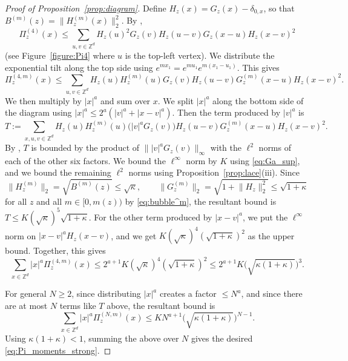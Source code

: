 \documentclass[11pt,hidelinks]{article}
\theoremstyle{plain}
\numberwithin{equation}{section}
\newcommand{\Z}{\mathbb{Z}}
\renewcommand{\(}{\left(}
\renewcommand{\)}{\right)}
\newcommand{\1}{\mathds{1}}
\providecommand{\abs}[1]{\lvert#1\rvert}
\providecommand{\norm}[1]{\lVert#1\rVert}
\newcommand{\mz}{m(z)}
\newcommand{\supm}{^{(m)}}
\begin{document}
\begin{proof}[Proof of Proposition~\ref{prop:diagram}]
Define $H_z(x) = G_z(x) - \delta_{0,x}$, so that $B\supm(z) = \norm{ H_z\supm(x) }_2^2$.
By \cite[Proposition~4.2]{Slad06}, 
\begin{equation}
\Pi_z^{(4)}(x) \le \sum_{ u,v \in \Z^d} 
	H_z(u)^2 G_z(v) H_z(u-v) G_z(x-u) H_z(x-v)^2 
\end{equation}
(see Figure~\ref{figure:Pi4}
where $u$ is the top-left vertex).
We distribute the exponential tilt along the top side using $e^{mx_1} = e^{mu_1} e^{m(x_1-u_1)}$. This gives
\begin{equation}
\Pi_z^{(4,m)}(x) \le \sum_{ u,v \in \Z^d} 
	H_z(u) H_z\supm(u) G_z(v) H_z(u-v) G_z\supm(x-u) H_z(x-v)^2.
\end{equation}
We then multiply by $\abs x^a$ and sum over $x$. 
We split $\abs x^a$ along the bottom side of the diagram using $\abs x^a \le 2^a ( \abs v^a + \abs{ x-v }^a )$. 
Then the term produced by $\abs v^a$ is
\begin{equation}
T :=  \sum_{ x,u,v \in \Z^d} 
	H_z(u) H_z\supm(u) \Big( \abs v^a G_z(v) \Big) H_z(u-v) G_z\supm(x-u) H_z(x-v)^2.
\end{equation}
By \cite[Lemma~4.6]{Slad06}, $T$ is bounded by the product of $\norm{ \abs v^a G_z(v) }_\infty$ with the $\ell^2$ norms of each of the other six factors. 
We bound the $\ell^\infty$ norm by $K$ using \eqref{eq:Ga_sup}, 
and we bound the remaining $\ell^2$ norms using Proposition~\ref{prop:lace}(iii). 
Since
\begin{equation} \label{eq:ell2_norms}
\norm{ H_z\supm }_2 = \sqrt{ B\supm(z)} \le \sqrt \kappa, \qquad
\norm{ G_z\supm}_2 = \sqrt{ 1 + \norm{ H_z }_2^2 } \le \sqrt{ 1 + \kappa }
\end{equation}
for all $z$ and all $m\in [0,\mz)$ by \eqref{eq:bubble^m},
the resultant bound is $T \le  K (\sqrt \kappa)^5 \sqrt{1+\kappa}$.
For the other term produced by $\abs{ x-v}^a$,
we put the $\ell^\infty$ norm on $\abs{x-v}^a H_z(x-v)$, and we get $K (\sqrt \kappa)^4 (\sqrt{1+\kappa})^2$ as the upper bound.
Together, this gives
\begin{equation}
\sum_{x\in \Z^d} \abs x^a \Pi_z^{(4,m)}(x) 
\le 2^{a+1} K (\sqrt \kappa)^4 (\sqrt{1+\kappa})^2 
\le 2^{a+1} K \Big(\sqrt{\kappa(1+\kappa)}\Big)^3 .
\end{equation}

For general $N \ge 2$, 
since distributing $\abs x^a$ creates a factor $\le N^a$, and 
since there are at most $N$ terms like $T$ above, the resultant bound is
\begin{equation}
\sum_{x\in \Z^d} \abs x^a \Pi_z^{(N,m)}(x)
\le K N^{a+1} \Big( \sqrt{ \kappa  (1+\kappa) } \Big)^{N-1} .
\end{equation}
Using $\kappa(1+\kappa)<1$, summing the above over $N$ gives the desired \eqref{eq:Pi_moments_strong}.
\end{proof}
\end{document}
